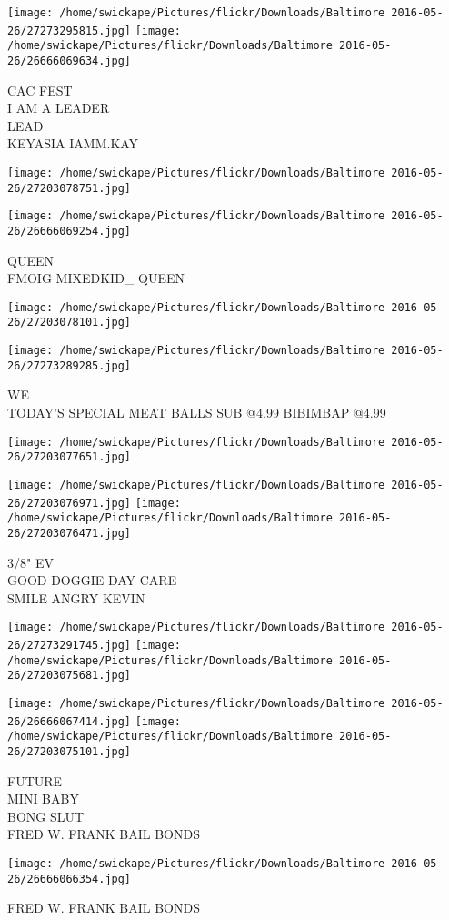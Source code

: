 \documentclass[10pt,letterpaper]{article}
\begin{document}
\texttt{[image: /home/swickape/Pictures/flickr/Downloads/Baltimore 2016-05-26/27273295815.jpg]}
\texttt{[image: /home/swickape/Pictures/flickr/Downloads/Baltimore 2016-05-26/26666069634.jpg]}

CAC FEST\\
I AM A LEADER\\
LEAD\\
KEYASIA IAMM.KAY\\
\pagebreak

\texttt{[image: /home/swickape/Pictures/flickr/Downloads/Baltimore 2016-05-26/27203078751.jpg]}

\vspace{0.25in}
\texttt{[image: /home/swickape/Pictures/flickr/Downloads/Baltimore 2016-05-26/26666069254.jpg]}

QUEEN\\
FMOIG MIXEDKID\_ QUEEN\\
\pagebreak

\texttt{[image: /home/swickape/Pictures/flickr/Downloads/Baltimore 2016-05-26/27203078101.jpg]}

\vspace{0.25in}
\texttt{[image: /home/swickape/Pictures/flickr/Downloads/Baltimore 2016-05-26/27273289285.jpg]}

WE\\
TODAY'S SPECIAL MEAT BALLS SUB @4.99 BIBIMBAP @4.99\\
\pagebreak

\texttt{[image: /home/swickape/Pictures/flickr/Downloads/Baltimore 2016-05-26/27203077651.jpg]}

\vspace{0.25in}
\texttt{[image: /home/swickape/Pictures/flickr/Downloads/Baltimore 2016-05-26/27203076971.jpg]}
\texttt{[image: /home/swickape/Pictures/flickr/Downloads/Baltimore 2016-05-26/27203076471.jpg]}

3/8" EV\\
GOOD DOGGIE DAY CARE\\
SMILE ANGRY KEVIN\\
\pagebreak

\texttt{[image: /home/swickape/Pictures/flickr/Downloads/Baltimore 2016-05-26/27273291745.jpg]}
\texttt{[image: /home/swickape/Pictures/flickr/Downloads/Baltimore 2016-05-26/27203075681.jpg]}

\texttt{[image: /home/swickape/Pictures/flickr/Downloads/Baltimore 2016-05-26/26666067414.jpg]}
\texttt{[image: /home/swickape/Pictures/flickr/Downloads/Baltimore 2016-05-26/27203075101.jpg]}

FUTURE\\
MINI BABY\\
BONG SLUT\\
FRED W. FRANK BAIL BONDS\\
\pagebreak

\texttt{[image: /home/swickape/Pictures/flickr/Downloads/Baltimore 2016-05-26/26666066354.jpg]}

FRED W. FRANK BAIL BONDS\\
\pagebreak
\end{document}
